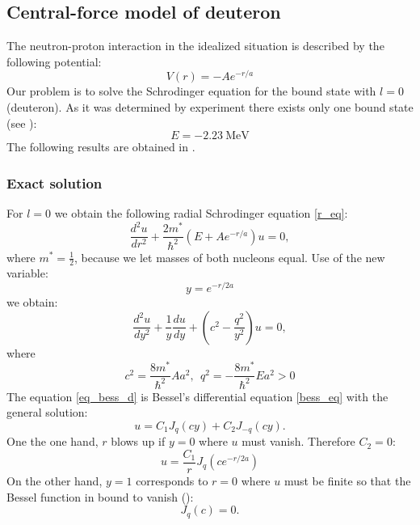 \documentclass[a4paper, 11pt]{article}
\begin{document}
\subsection{Central-force model of deuteron}
The neutron-proton interaction in the idealized situation is described by the following potential:
$$V(r) = - A e^{-r/a}$$
Our problem is to solve the Schrodinger equation for the bound state with $l=0$ (deuteron). As it was determined by experiment there exists only one bound state (see \cite{griffiths2016introduction}):
\begin{equation}
    E = -2.23~\mathrm{MeV}
\end{equation}
The following results are obtained in \cite{griffiths2016introduction}.


\subsubsection{Exact solution}
For $l = 0$ we obtain the following radial Schrodinger equation \eqref{r_eq}:
\begin{equation}
    \frac{d^2 u}{d r^2} + \frac{2 m^*}{\hbar^2}(E+ A e^{-r/a})u = 0,
\end{equation}
where $m^* = \frac{1}{2}$, because we let masses of both nucleons equal. Use of the new variable:
\begin{equation}\label{abbr}
    y = e^{-r/2a}
\end{equation}
we obtain:
\begin{equation}\label{eq_bess_d}
    \frac{d^2 u}{d y^2} + \frac{1}{y}\frac{d u}{d y} + (c^2 - \frac{q^2}{y^2})u=0,
\end{equation}
where
\begin{equation}\label{abbr_2}
    c^2 = \frac{8 m^*}{\hbar^2}A a^2,~~q^2 = -\frac{8 m^*}{\hbar^2}E a^2 > 0
\end{equation}
The equation  \eqref{eq_bess_d} is Bessel's differential equation \eqref{bess_eq} with the general solution:
$$u = C_1 J_q(cy) + C_2 J_{-q} (cy).$$
One the one hand, $r$ blows up if $y = 0$ where $u$ must vanish. Therefore $C_2 = 0:$
\begin{equation}\label{ex_sol_deuteron}
    u = \frac{C_1}{r}J_q(c e^{-r/2a})
\end{equation}
On the other hand, $y = 1$ corresponds to $r = 0$ where $u$ must be finite so that the Bessel function in bound to vanish (\cite{griffiths2016introduction}):
$$J_q(c) = 0.$$
\end{document}
